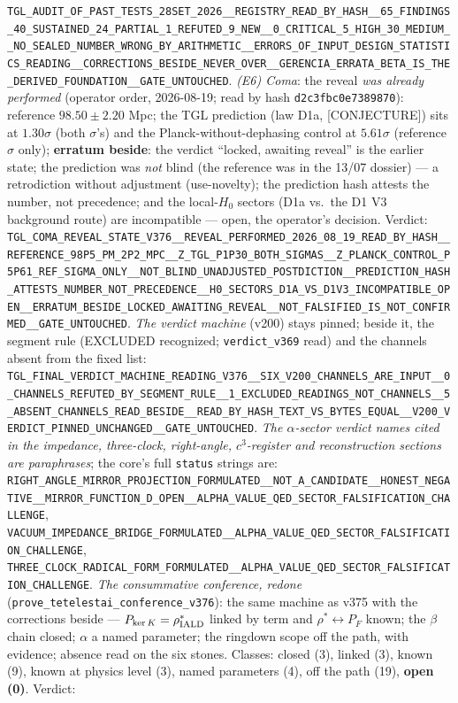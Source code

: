 \documentclass[11pt]{article}
\theoremstyle{definition}\newtheorem{deriv}{Derivation}
\begin{document}
\texttt{TGL\_AUDIT\_OF\_PAST\_TESTS\_28SET\_2026\_\_REGISTRY\_READ\_BY\_HASH\_\_65\_FINDINGS\_40\_SUSTAINED\_24\_PARTIAL\_1\_REFUTED\_9\_NEW\_\_0\_CRITICAL\_5\_HIGH\_30\_MEDIUM\_\_NO\_SEALED\_NUMBER\_WRONG\_BY\_ARITHMETIC\_\_ERRORS\_OF\_INPUT\_DESIGN\_STATISTICS\_READING\_\_CORRECTIONS\_BESIDE\_NEVER\_OVER\_\_GERENCIA\_ERRATA\_BETA\_IS\_THE\_DERIVED\_FOUNDATION\_\_GATE\_UNTOUCHED}. \emph{(E6) Coma}: the reveal \emph{was already performed} (operator order, 2026-08-19; read by hash \texttt{d2c3fbc0e7389870}): reference $98.50\pm2.20$ Mpc; the TGL prediction (law D1a, \textsf{[CONJECTURE]}) sits at $1.30\sigma$ (both $\sigma$'s) and the Planck-without-dephasing control at $5.61\sigma$ (reference $\sigma$ only); \textbf{erratum beside}: the verdict ``locked, awaiting reveal'' is the earlier state; the prediction was \emph{not} blind (the reference was in the 13/07 dossier) --- a retrodiction without adjustment (use-novelty); the prediction hash attests the number, not precedence; and the local-$H_0$ sectors (D1a vs.\ the D1 V3 background route) are incompatible --- open, the operator's decision. Verdict: \texttt{TGL\_COMA\_REVEAL\_STATE\_V376\_\_REVEAL\_PERFORMED\_2026\_08\_19\_READ\_BY\_HASH\_\_REFERENCE\_98P5\_PM\_2P2\_MPC\_\_Z\_TGL\_P1P30\_BOTH\_SIGMAS\_\_Z\_PLANCK\_CONTROL\_P5P61\_REF\_SIGMA\_ONLY\_\_NOT\_BLIND\_UNADJUSTED\_POSTDICTION\_\_PREDICTION\_HASH\_ATTESTS\_NUMBER\_NOT\_PRECEDENCE\_\_H0\_SECTORS\_D1A\_VS\_D1V3\_INCOMPATIBLE\_OPEN\_\_ERRATUM\_BESIDE\_LOCKED\_AWAITING\_REVEAL\_\_NOT\_FALSIFIED\_IS\_NOT\_CONFIRMED\_\_GATE\_UNTOUCHED}. \emph{The verdict machine} (v200) stays pinned; beside it, the segment rule (EXCLUDED recognized; \texttt{verdict\_v369} read) and the channels absent from the fixed list: \texttt{TGL\_FINAL\_VERDICT\_MACHINE\_READING\_V376\_\_SIX\_V200\_CHANNELS\_ARE\_INPUT\_\_0\_CHANNELS\_REFUTED\_BY\_SEGMENT\_RULE\_\_1\_EXCLUDED\_READINGS\_NOT\_CHANNELS\_\_5\_ABSENT\_CHANNELS\_READ\_BESIDE\_\_READ\_BY\_HASH\_TEXT\_VS\_BYTES\_EQUAL\_\_V200\_VERDICT\_PINNED\_UNCHANGED\_\_GATE\_UNTOUCHED}. \emph{The $\alpha$-sector verdict names cited in the impedance, three-clock, right-angle, $c^3$-register and reconstruction sections are paraphrases}; the core's full \texttt{status} strings are: \texttt{RIGHT\_ANGLE\_MIRROR\_PROJECTION\_FORMULATED\_\_NOT\_A\_CANDIDATE\_\_HONEST\_NEGATIVE\_\_MIRROR\_FUNCTION\_D\_OPEN\_\_ALPHA\_VALUE\_QED\_SECTOR\_FALSIFICATION\_CHALLENGE}, \texttt{VACUUM\_IMPEDANCE\_BRIDGE\_FORMULATED\_\_ALPHA\_VALUE\_QED\_SECTOR\_FALSIFICATION\_CHALLENGE}, \texttt{THREE\_CLOCK\_RADICAL\_FORM\_FORMULATED\_\_ALPHA\_VALUE\_QED\_SECTOR\_FALSIFICATION\_CHALLENGE}. \emph{The consummative conference, redone} (\texttt{prove\_tetelestai\_conference\_v376}): the same machine as v375 with the corrections beside --- $P_{\ker K}=\rho^\ast_{\rm IALD}$ linked by term and $\rho^\ast\leftrightarrow P_F$ known; the $\beta$ chain closed; $\alpha$ a named parameter; the ringdown scope off the path, with evidence; absence read on the six stones. Classes: closed (3), linked (3), known (9), known at physics level (3), named parameters (4), off the path (19), \textbf{open (0)}. Verdict: 
\end{document}
